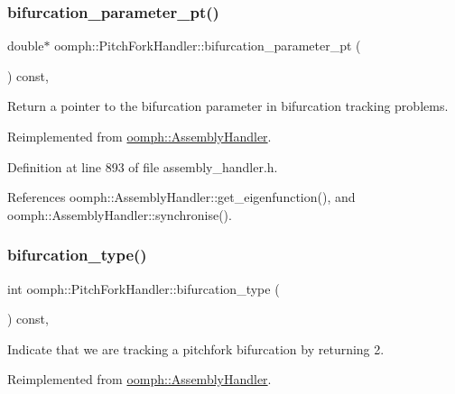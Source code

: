 \subsubsection{\texorpdfstring{bifurcation\+\_\+parameter\+\_\+pt()}{bifurcation\_parameter\_pt()}}
{\footnotesize\ttfamily double$\ast$ oomph\+::\+Pitch\+Fork\+Handler\+::bifurcation\+\_\+parameter\+\_\+pt (\begin{DoxyParamCaption}{ }\end{DoxyParamCaption}) const\hspace{0.3cm}{\ttfamily [inline]}, {\ttfamily [virtual]}}



Return a pointer to the bifurcation parameter in bifurcation tracking problems. 



Reimplemented from \hyperlink{classoomph_1_1AssemblyHandler_a3e369ec692c3d36a4a2a8a64dab7fe2b}{oomph\+::\+Assembly\+Handler}.



Definition at line 893 of file assembly\+\_\+handler.\+h.



References oomph\+::\+Assembly\+Handler\+::get\+\_\+eigenfunction(), and oomph\+::\+Assembly\+Handler\+::synchronise().

\mbox{\label{classoomph_1_1PitchForkHandler_aadc4f0b5dfb82cf171b91432536d1679}} 
\subsubsection{\texorpdfstring{bifurcation\+\_\+type()}{bifurcation\_type()}}
{\footnotesize\ttfamily int oomph\+::\+Pitch\+Fork\+Handler\+::bifurcation\+\_\+type (\begin{DoxyParamCaption}{ }\end{DoxyParamCaption}) const\hspace{0.3cm}{\ttfamily [inline]}, {\ttfamily [virtual]}}



Indicate that we are tracking a pitchfork bifurcation by returning 2. 



Reimplemented from \hyperlink{classoomph_1_1AssemblyHandler_a22c5f240674e4f6cee12006790c11dae}{oomph\+::\+Assembly\+Handler}.



